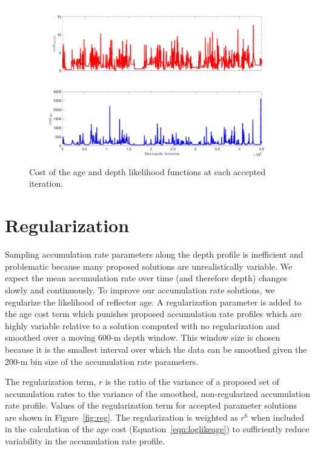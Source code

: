 \begin{figure}[ht]
\centering
\includegraphics[scale=0.4]{../analysis/figures/cost}
\caption[]{Cost of the age and depth likelihood functions at each accepted iteration.}
\label{fig:cost}
\end{figure}





\section{Regularization}\label{sec:regularization}

Sampling accumulation rate parameters along the depth profile is inefficient and problematic because many proposed solutions are unrealistically variable. We expect the mean accumulation rate over time (and therefore depth) changes slowly and continuously. To improve our accumulation rate solutions, we regularize the likelihood of reflector age. A regularization parameter is added to the age cost term which punishes proposed accumulation rate profiles which are highly variable relative to a solution computed with no regularization and smoothed over a moving 600-m depth window. This window size is chosen because it is the smallest interval over which the data can be smoothed given the 200-m bin size of the accumulation rate parameters. 

The regularization term, $r$ is the ratio of the variance of a proposed set of accumulation rates to the variance of the smoothed, non-regularized accumulation rate profile. Values of the regularization term for accepted parameter solutions are shown in Figure~\ref{fig:reg}. The regularization is weighted as $r^6$ when included in the calculation of the age cost (Equation~\ref{eqn:loglikeage}) to sufficiently reduce variability in the accumulation rate profile. 


